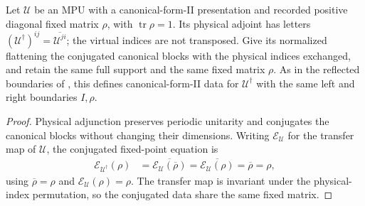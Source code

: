 \begin{definition}
    \label{def:mpug_adjoint_canonical_boundaries}
    \leanok
    Let $\mathcal U$ be an MPU with a canonical-form-II presentation and
    recorded positive diagonal fixed matrix $\rho$, with
    $\operatorname{tr}\rho=1$. Its physical adjoint has letters
    $(\mathcal U^\dagger)^{ij}=\overline{\mathcal U^{ji}}$; the virtual
    indices are not transposed. Give its normalized flattening the
    conjugated canonical blocks with the physical indices exchanged, and
    retain the same full support and the same fixed matrix $\rho$.
    As in the reflected boundaries of
    \cite[lines~1164--1254]{FrancoRubio2025MPUGauging}, this defines
    canonical-form-II data for $\mathcal U^\dagger$ with the same left and
    right boundaries $I,\rho$.
\end{definition}

\begin{proof}\leanok
    Physical adjunction preserves periodic unitarity and conjugates the
    canonical blocks without changing their dimensions. Writing
    $\mathcal E_{\mathcal U}$ for the transfer map of $\mathcal U$, the
    conjugated fixed-point equation is
    \begin{align}
        \mathcal E_{\mathcal U^\dagger}(\rho)
         & =\overline{\mathcal E_{\mathcal U}(\overline\rho)}
        =\overline{\mathcal E_{\mathcal U}(\rho)}
        =\overline\rho=\rho,
    \end{align}
    using $\overline\rho=\rho$ and $\mathcal E_{\mathcal U}(\rho)=\rho$. The transfer map is invariant under the physical-index permutation, so the
    conjugated data share the same fixed matrix.
\end{proof}

